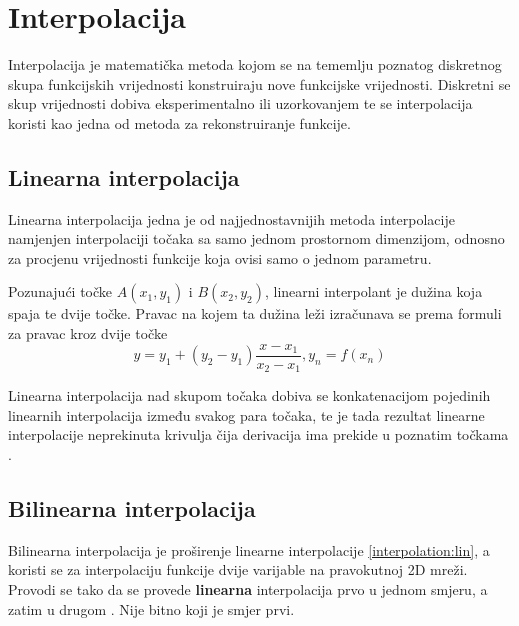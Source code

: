 \section{Interpolacija}
\label{sec:interpolacija}

Interpolacija je matematička metoda kojom se na tememlju poznatog diskretnog skupa funkcijskih vrijednosti konstruiraju nove funkcijske vrijednosti. Diskretni se skup vrijednosti dobiva eksperimentalno ili uzorkovanjem te se interpolacija koristi kao jedna od metoda za rekonstruiranje funkcije. \citep{_interpolation_2013}


\subsection{Linearna interpolacija}
\label{subsec:linInt}
\label{interpolation:lin}

Linearna interpolacija jedna je od najjednostavnijih metoda interpolacije namjenjen interpolaciji točaka sa samo jednom prostornom dimenzijom, odnosno za procjenu vrijednosti funkcije koja ovisi samo o jednom parametru. 

Pozunajući točke $A (x_1, y_1)$ i $B (x_2, y_2)$, linearni interpolant je dužina koja spaja te dvije točke. Pravac na kojem ta dužina leži izračunava se prema formuli za pravac kroz dvije točke \citep{_linear_2013}
\begin{equation}
	y = y_1 + (y_2 - y_1) \frac{x - x_1}{x_2 - x_1}, y_n = f(x_n)
\end{equation}

Linearna interpolacija nad skupom točaka dobiva se konkatenacijom pojedinih linearnih interpolacija između svakog para točaka, te je tada rezultat linearne interpolacije neprekinuta krivulja čija derivacija ima prekide u poznatim točkama \citep{Bosilj2010} \citep{_linear_2013}.

\subsection{Bilinearna interpolacija}
\label{subsec:bilinInt}

Bilinearna interpolacija je proširenje linearne interpolacije \ref{interpolation:lin}, a koristi se za interpolaciju funkcije dvije varijable na pravokutnoj 2D mreži. Provodi se tako da se provede \textbf{linearna} interpolacija prvo u jednom smjeru, a zatim u drugom \citep {_bilinear_2013}. Nije bitno koji je smjer prvi.

